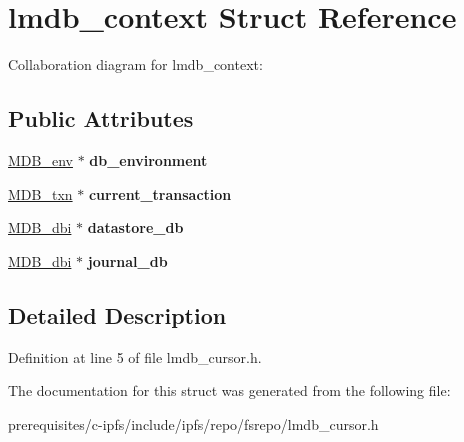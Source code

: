 \hypertarget{structlmdb__context}{}\section{lmdb\+\_\+context Struct Reference}
\label{structlmdb__context}


Collaboration diagram for lmdb\+\_\+context\+:
\subsection*{Public Attributes}
\begin{DoxyCompactItemize}
\item 
\mbox{\label{structlmdb__context_ae9fee2d13633cc4540b29852922eac87}} 
\mbox{\hyperlink{struct_m_d_b__env}{M\+D\+B\+\_\+env}} $\ast$ {\bfseries db\+\_\+environment}
\item 
\mbox{\label{structlmdb__context_a16075c646370ebfd40b6c4d3f565827d}} 
\mbox{\hyperlink{struct_m_d_b__txn}{M\+D\+B\+\_\+txn}} $\ast$ {\bfseries current\+\_\+transaction}
\item 
\mbox{\label{structlmdb__context_a37d3c732a5620afee89e5dc799e2736e}} 
\mbox{\hyperlink{group__mdb_gadbe68a06c448dfb62da16443d251a78b}{M\+D\+B\+\_\+dbi}} $\ast$ {\bfseries datastore\+\_\+db}
\item 
\mbox{\label{structlmdb__context_a60a6dbaeb1d75258688452ca2b700562}} 
\mbox{\hyperlink{group__mdb_gadbe68a06c448dfb62da16443d251a78b}{M\+D\+B\+\_\+dbi}} $\ast$ {\bfseries journal\+\_\+db}
\end{DoxyCompactItemize}


\subsection{Detailed Description}


Definition at line 5 of file lmdb\+\_\+cursor.\+h.



The documentation for this struct was generated from the following file\+:\begin{DoxyCompactItemize}
\item 
prerequisites/c-\/ipfs/include/ipfs/repo/fsrepo/lmdb\+\_\+cursor.\+h\end{DoxyCompactItemize}
